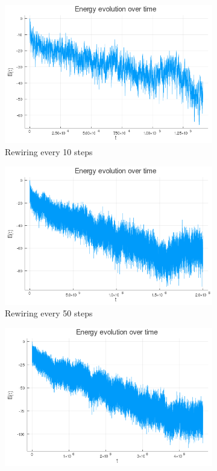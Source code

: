 \documentclass[12pt,openright,twoside]{book}
\begin{document}
\begin{appendices}
\begin{figure}[!htb]
\centering
\begin{subfigure}{0.47\linewidth}
    \includegraphics[width=\linewidth]{figures/2_2_10rew/energy_evolution.png}
    \caption{Rewiring every 10 steps}
\end{subfigure}
\begin{subfigure}{0.47\linewidth}
    \includegraphics[width=\linewidth]{figures/2_2_50rew/energy_evolution.png}
    \caption{Rewiring every 50 steps}
\end{subfigure}
\begin{subfigure}{0.47\linewidth}
    \includegraphics[width=\linewidth]{figures/2_2_100rew/energy_evolution.png}

\end{subfigure}
\end{figure}
\end{appendices}
\end{document}
